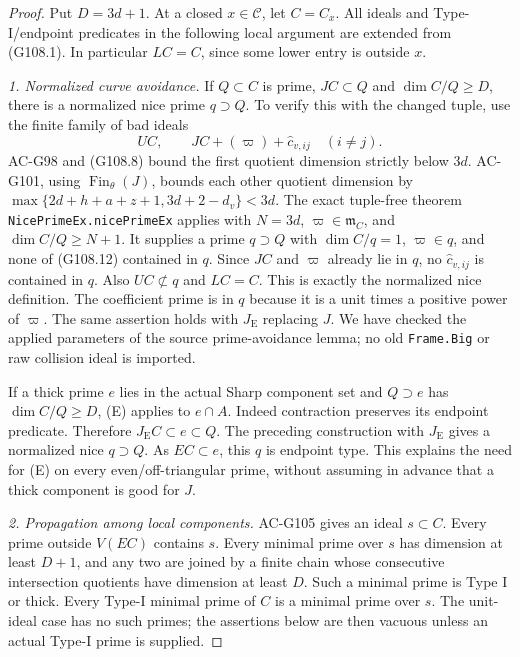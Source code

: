 \begin{proof}
Put $D=3d+1$.  At a closed $x\in\mathcal C$, let $C=C_x$.
All ideals and Type-I/endpoint predicates in the following local
argument are extended from (G108.1).  In particular $LC=C$, since
some lower entry is outside $x$.

\emph{1. Normalized curve avoidance.}
If $Q\subset C$ is prime, $JC\subset Q$ and $\dim C/Q\geq D$,
there is a normalized nice prime $q\supset Q$.  To verify this
with the changed tuple, use the finite family of bad ideals
\[
 UC,\qquad JC+(\varpi)+\widehat c_{v,ij}\quad(i\ne j).
 \tag{G108.12}
\]
AC-G98 and (G108.8) bound the first quotient dimension strictly
below $3d$.  AC-G101, using $\operatorname{Fin}_{\theta}(J)$,
bounds each other quotient dimension by
$\max\{2d+h+a+z+1,3d+2-d_v\}<3d$.
The exact tuple-free theorem \texttt{NicePrimeEx.nicePrimeEx}
applies with $N=3d$, $\varpi\in\mathfrak m_C$, and
$\dim C/Q\geq N+1$.  It supplies a prime $q\supset Q$ with
$\dim C/q=1$, $\varpi\in q$, and none of (G108.12) contained
in $q$.  Since $JC$ and $\varpi$ already lie in $q$, no
$\widehat c_{v,ij}$ is contained in $q$.  Also $UC\not\subset q$
and $LC=C$.  This is exactly the normalized nice definition.
The coefficient prime is in $q$ because it is a unit times a
positive power of $\varpi$.
The same assertion holds with $J_{\mathrm E}$ replacing $J$.
We have checked the applied parameters of the source prime-avoidance
lemma; no old \texttt{Frame.Big} or raw collision ideal is imported.

If a thick prime $e$ lies in the actual Sharp component set and
$Q\supset e$ has $\dim C/Q\geq D$, (E) applies to $e\cap A$.
Indeed contraction preserves its endpoint predicate.  Therefore
$J_{\mathrm E}C\subset e\subset Q$.  The preceding construction
with $J_{\mathrm E}$ gives a normalized nice $q\supset Q$.
As $EC\subset e$, this $q$ is endpoint type.  This explains the
need for (E) on every even/off-triangular prime, without assuming
in advance that a thick component is good for $J$.

\emph{2. Propagation among local components.}
AC-G105 gives an ideal $s\subset C$.  Every prime outside $V(EC)$
contains $s$.  Every minimal prime over $s$ has dimension at least
$D+1$, and any two are joined by a finite chain whose consecutive
intersection quotients have dimension at least $D$.  Such a
minimal prime is Type I or thick.  Every Type-I minimal prime
of $C$ is a minimal prime over $s$.
The unit-ideal case has no such primes; the assertions below
are then vacuous unless an actual Type-I prime is supplied.


\end{proof}
